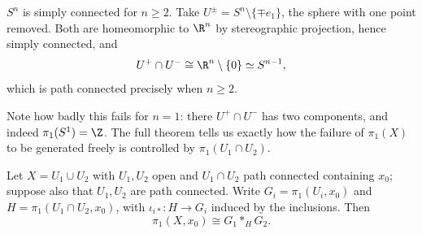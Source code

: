 \begin{example} \label{ex:sn-sc}
	$S^n$ is simply connected for $n \geq 2$. Take $U^{\pm} = S^n \setminus \{\mp e_1\}$, the sphere with one point removed. Both are homeomorphic to $\R^n$ by stereographic projection, hence simply connected, and
	$$
	U^+ \cap U^- \cong \R^n \setminus\{0\} \simeq S^{n-1},
	$$
	which is path connected precisely when $n \geq 2$.
\end{example}

Note how badly this fails for $n = 1$: there $U^+ \cap U^-$ has two components, and
indeed $\pi_1(S^1) = \Z$. The full theorem tells us exactly how the failure of $\pi_1(X)$
to be generated freely is controlled by $\pi_1(U_1 \cap U_2)$.

\begin{theorem} \label{thm:vk}
	Let $X = U_1 \cup U_2$ with $U_1, U_2$ open and $U_1 \cap U_2$ path connected containing $x_0$; suppose also that $U_1, U_2$ are path connected. Write $G_i = \pi_1(U_i, x_0)$ and $H = \pi_1(U_1\cap U_2, x_0)$, with $\iota_{i*}: H \to G_i$ induced by the inclusions. Then
	$$
	\pi_1(X, x_0) \cong G_1 *_H G_2 .
	$$
\end{theorem}
